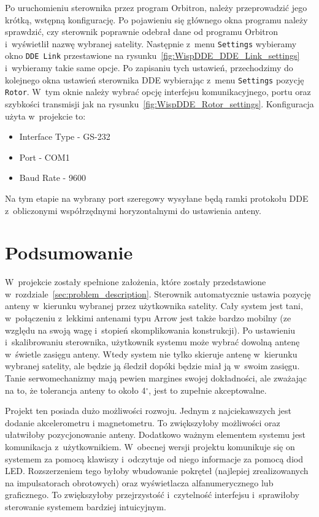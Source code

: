 \documentclass[eng,oneside]{mgr}
\begin{document}
			Po uruchomieniu sterownika przez program Orbitron, należy przeprowadzić jego krótką, wstępną konfigurację. Po pojawieniu się głównego okna programu należy sprawdzić, czy sterownik poprawnie odebrał dane od programu Orbitron i~wyświetlił nazwę wybranej satelity. Następnie z~menu \texttt{Settings} wybieramy okno \texttt{DDE Link} przestawione na rysunku~\ref{fig:WispDDE_DDE_Link_settings} i~wybieramy takie same opcje. 
			Po zapisaniu tych ustawień, przechodzimy do kolejnego okna ustawień sterownika DDE wybierając z~menu \texttt{Settings} pozycję \texttt{Rotor}. W~tym oknie należy wybrać opcję interfejsu komunikacyjnego, portu oraz szybkości transmisji jak na rysunku~\ref{fig:WispDDE_Rotor_settings}. Konfiguracja użyta w~projekcie to:
			\begin{itemize}
				\item Interface Type - GS-232
				\item Port - COM1
				\item Baud Rate - 9600
			\end{itemize}

			Na tym etapie na wybrany port szeregowy wysyłane będą ramki protokołu DDE z~obliczonymi współrzędnymi horyzontalnymi do ustawienia anteny.

	\chapter{Podsumowanie}
	\label{sec:summit}
	W~projekcie zostały spełnione założenia, które zostały przedstawione w~rozdziale~\ref{sec:problem_description}. Sterownik automatycznie ustawia pozycję anteny w~kierunku wybranej przez użytkownika satelity. Cały system jest tani, w~połączeniu z~lekkimi antenami typu Arrow jest także bardzo mobilny (ze względu na swoją wagę i~stopień skomplikowania konstrukcji). Po ustawieniu i~skalibrowaniu sterownika, użytkownik systemu może wybrać dowolną antenę w~świetle zasięgu anteny. Wtedy system nie tylko skieruje antenę w~kierunku wybranej satelity, ale będzie ją śledził dopóki będzie miał ją w~swoim zasięgu. Tanie serwomechanizmy mają pewien margines swojej dokładności, ale zważając na to, że tolerancja anteny to około 4$^{\circ}$, jest to zupełnie akceptowalne.

	Projekt ten posiada dużo możliwości rozwoju. Jednym z najciekawszych jest dodanie akcelerometru i magnetometru. To zwiększyłoby możliwości oraz ułatwiłoby pozycjonowanie anteny. Dodatkowo ważnym elementem systemu jest komunikacja z~użytkownikiem. W~obecnej wersji projektu komunikuje się on systemem za pomocą klawiszy i~odczytuje od niego informacje za pomocą diod LED. Rozszerzeniem tego byłoby wbudowanie pokręteł (najlepiej zrealizowanych na impulsatorach obrotowych) oraz wyświetlacza alfanumerycznego lub graficznego. To zwiększyłoby przejrzystość i~czytelność interfejsu i~sprawiłoby sterowanie systemem bardziej intuicyjnym. 
\end{document}

